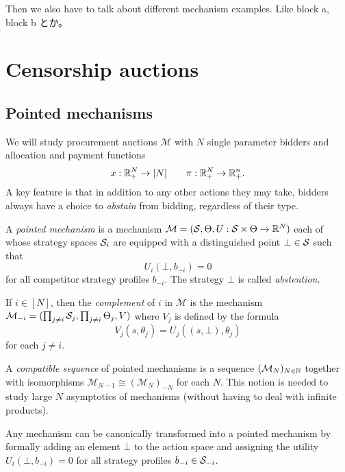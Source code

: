 Then we also have to talk about different mechanism examples.
%
Like block a, block b とか。



\section{Censorship auctions}

\subsection{Pointed mechanisms}

We will study procurement auctions $\mathcal{M}$ with $N$ single parameter bidders and allocation and payment functions 
\[
  x: \mathbb{R}_+^N\rightarrow [N] \qquad \pi:\mathbb{R}_+^N\rightarrow \mathbb{R}_+^n.
\]
%
A key feature is that in addition to any other actions they may take, bidders always have a choice to \emph{abstain} from bidding, regardless of their type.

\begin{definition}

  A \emph{pointed mechanism} is a mechanism $\mathcal{M}=(\mathcal{S},\Theta,U:\mathcal{S}\times\Theta\rightarrow\mathbb{R}^N)$ each of whose strategy spaces $\mathcal{S}_i$ are equipped with a distinguished point $\bot\in\mathcal{S}$ such that
  \[
    U_i(\bot,b_{-i})=0 
  \]
  for all competitor strategy profiles $b_{-i}$.
  The strategy $\bot$ is called \emph{abstention}.

  If $i\in[N]$, then the \emph{complement} of $i$ in $\mathcal{M}$ is the mechanism $\mathcal{M}_{-i}=(\prod_{j\neq i}\mathcal{S}_j,\prod_{j\neq i}\Theta_j,V)$ where $V_j$ is defined by the formula
  \[
    V_j(s,\theta_j) = U_j((s,\bot),\theta_j)
  \]
  for each $j\neq i$.
  
  A \emph{compatible sequence} of pointed mechanisms is a sequence $(\mathcal{M}_N)_{N\in\mathbb{N}}$ together with isomorphisms $\mathcal{M}_{N-1}\cong (\mathcal{M}_N)_{-N}$ for each $N$.
  This notion is needed to study large $N$ asymptotics of mechanisms (without having to deal with infinite products).

\end{definition}

Any mechanism can be canonically transformed into a pointed mechanism by formally adding an element $\bot$ to the action space and assigning the utility $U_i(\bot,b_{-i})=0$ for all strategy profiles $b_{-i}\in\mathcal{S}_{-i}$.

